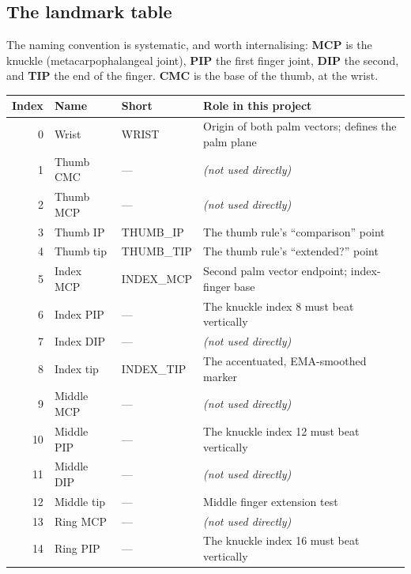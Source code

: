 \subsection{The landmark table}

The naming convention is systematic, and worth internalising: \textbf{MCP} is the knuckle
(metacarpophalangeal joint), \textbf{PIP} the first finger joint, \textbf{DIP} the second, and
\textbf{TIP} the end of the finger. \textbf{CMC} is the base of the thumb, at the wrist.

\begin{center}
\begin{tabularx}{\textwidth}{@{}r l l X@{}}
\toprule
\rowcolor{white}
\textbf{Index} & \textbf{Name} & \textbf{Short} & \textbf{Role in this project} \\
\midrule
0  & Wrist              & WRIST      & Origin of both palm vectors; defines the palm plane \\
1  & Thumb CMC          & ---        & \textit{(not used directly)} \\
2  & Thumb MCP          & ---        & \textit{(not used directly)} \\
3  & Thumb IP           & THUMB\_IP  & The thumb rule's ``comparison'' point \\
4  & Thumb tip          & THUMB\_TIP & The thumb rule's ``extended?'' point \\
5  & Index MCP          & INDEX\_MCP & Second palm vector endpoint; index-finger base \\
6  & Index PIP          & ---        & The knuckle index 8 must beat vertically \\
7  & Index DIP          & ---        & \textit{(not used directly)} \\
8  & Index tip          & INDEX\_TIP & The accentuated, EMA-smoothed marker \\
9  & Middle MCP         & ---        & \textit{(not used directly)} \\
10 & Middle PIP         & ---        & The knuckle index 12 must beat vertically \\
11 & Middle DIP         & ---        & \textit{(not used directly)} \\
12 & Middle tip         & ---        & Middle finger extension test \\
13 & Ring MCP           & ---        & \textit{(not used directly)} \\
14 & Ring PIP           & ---        & The knuckle index 16 must beat vertically \\

\end{tabularx}
\end{center}
